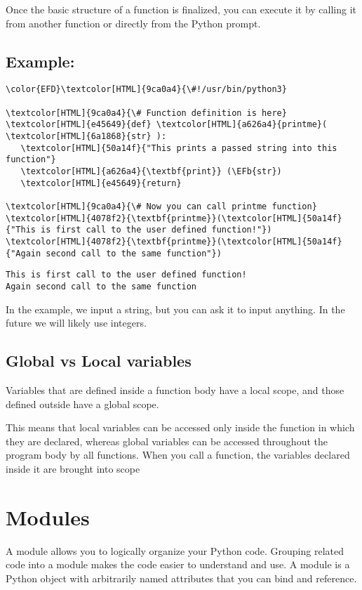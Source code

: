 \documentclass{scrartcl}
\newcommand{\EFb}[1]{\textcolor{EFb}{#1}} %
\begin{document}
Once the basic structure of a function is finalized, you can execute it by
calling it from another function or directly from the Python prompt.

\subsection{Example:}
\label{sec:orgc2d09ca}
\begin{Code}
\begin{Verbatim}[]
\color{EFD}\textcolor[HTML]{9ca0a4}{\#!/usr/bin/python3}

\textcolor[HTML]{9ca0a4}{\# Function definition is here}
\textcolor[HTML]{e45649}{def} \textcolor[HTML]{a626a4}{printme}( \textcolor[HTML]{6a1868}{str} ):
   \textcolor[HTML]{50a14f}{"This prints a passed string into this function"}
   \textcolor[HTML]{a626a4}{\textbf{print}} (\EFb{str})
   \textcolor[HTML]{e45649}{return}

\textcolor[HTML]{9ca0a4}{\# Now you can call printme function}
\textcolor[HTML]{4078f2}{\textbf{printme}}(\textcolor[HTML]{50a14f}{"This is first call to the user defined function!"})
\textcolor[HTML]{4078f2}{\textbf{printme}}(\textcolor[HTML]{50a14f}{"Again second call to the same function"})
\end{Verbatim}
\end{Code}

\begin{verbatim}
This is first call to the user defined function!
Again second call to the same function
\end{verbatim}


In the example, we input a string, but you can ask it to input anything. In the
future we will likely use integers.

\subsection{Global vs Local variables}
\label{sec:org84bb3eb}
Variables that are defined inside a function body have a local scope, and those defined outside have a global scope.

This means that local variables can be accessed only inside the function in
which they are declared, whereas global variables can be accessed throughout the
program body by all functions. When you call a function, the variables declared
inside it are brought into scope

\section{Modules}
\label{sec:org3c4933d}
A module allows you to logically organize your Python code. Grouping related code into a module makes the code easier to understand and use. A module is a Python object with arbitrarily named attributes that you can bind and reference.
\end{document}
